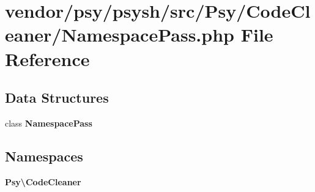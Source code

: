 \section{vendor/psy/psysh/src/\+Psy/\+Code\+Cleaner/\+Namespace\+Pass.php File Reference}
\label{_namespace_pass_8php}
\subsection*{Data Structures}
\begin{DoxyCompactItemize}
\item 
class {\bf Namespace\+Pass}
\end{DoxyCompactItemize}
\subsection*{Namespaces}
\begin{DoxyCompactItemize}
\item 
 {\bf Psy\textbackslash{}\+Code\+Cleaner}
\end{DoxyCompactItemize}
